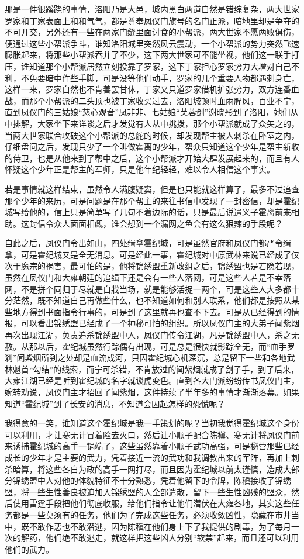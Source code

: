 那是一件很蹊跷的事情，洛阳乃是大邑，城内黑白两道自然是错综复杂，两大世家罗家和丁家表面上和和气气，都是尊奉凤仪门旗号的名门正派，暗地里却是争夺的不可开交，另外还有一些在两家门缝里面讨食的小帮派，两大世家不愿两败俱伤，便通过这些小帮派争斗，谁知洛阳城里突然风云震动，一个小帮派的势力突然飞速膨胀起来，将那些小帮派吞并了不少，这下两大世家可不能坐视，他们这一联手打压，谁知道那个小帮派居然立刻投靠了罗家，这下丁家担心罗家势力大增对自己不利，不免要暗中作些手脚，可是没等他们动手，罗家的几个重要人物都遇刺身亡，这样一来，罗家自然也不肯善罢甘休，丁家又只道罗家借机扩张势力，双方连番血战，而那个小帮派的二头顶也被丁家收买过去，洛阳城顿时血雨腥风，百业不宁，直到凤仪门的三姑娘“慈心观音”凤非非、七姑娘“芙蓉剑”谢晓彤到了洛阳，她们从中排解，大家坐下来详谈之后才发觉有人从中挑拨，那个小帮派就成了众矢之的，当两大世家联合攻破这个小帮派的总舵的时候，却发现帮主被人刺杀在卧室之内，仔细盘问之后，发现只少了一个叫做霍离的少年，帮众只知道这个少年是帮主新收的侍卫，也是从他来到了帮中之后，这个小帮派才开始大肆发展起来的，而且有人怀疑这个少年正是帮主的军师，只是他年纪轻轻，难以令人相信这个事实。

若是事情就这样结束，虽然令人满腹疑窦，但是也只能就这样算了，最多不过追查那个少年的来历，可是问题是在那个帮主的来往书信中发现了一封密信，却是霍纪城写给他的，信上只是简单写了几句不着边际的话，只是最后说遣义子霍离前来相助。这封信令众人面面相觑，谁会想到一个漏网之鱼会有这么狠辣的手段呢？

自此之后，凤仪门令出如山，四处缉拿霍纪城，可是虽然官府和凤仪门都严令缉拿，可是霍纪城又是全无消息。可是经此一事，霍纪城对中原武林来说已经成了仅次于魔宗的祸害，最可怕的是，他将锦绣盟重新改组之后，锦绣盟也是若隐若现，虽然在凤仪门和大雍朝廷的追缉下还是会有一些人落网，可是这些人若是不幸落网，不是拼个同归于尽就是自戕当场，就是能够活捉一两个，可是这些人大多都十分茫然，既不知道自己再做些什么，也不知道如何和别人联系，他们都是按照从某些地方得到书面指令行事的，可是到了这里就再也查不下去。可是从已经得到的情报，可以看出锦绣盟已经成了一个神秘可怕的组织。所以凤仪门主的大弟子闻紫烟再次出现江湖，负责追杀锦绣盟中人，凤仪门传令江湖，凡是锦绣盟中人，杀之无赦。从那以后，霍纪城虽然行踪偶有出现，可是总是很快就影踪全无，而“血手罗刹”闻紫烟所到之处却是血流成河，只因霍纪城心机深沉，总是留下一些和各地武林魁首“勾结”的线索，而宁可杀错，不肯放过的闻紫烟就成了刽子手，到了后来，大雍江湖已经是听到霍纪城的名字就谈虎变色。直到各大门派纷纷传书凤仪门主，婉转劝说，凤仪门主才招回了闻紫烟，这件持续了半年多的事情才渐渐落幕。如果知道“霍纪城”到了长安的消息，不知道会因起怎样的恐慌呢？

我得意的一笑，谁知道这个霍纪城是我一手策划的呢？当初我觉得霍纪城这个身份可以利用，才让寒无计冒着险去灭口，然后让小顺子配合陈稹、寒无计将凤仪门前来诱捕霍纪城的高手一锅端了，这些虽然靠着小顺子武功高强，可是秘营那些已经成长的少年才是主要的武力，凭着接近一流的武功和我调教出来的军阵，再加上刺杀暗算，将这些各自为政的高手一网打尽，而且因为霍纪城以前太谨慎，造成大部分锦绣盟中人对他的体貌特征不十分熟悉，凭着他留下的令牌，陈稹接收了锦绣盟，将一些生性善良被迫加入锦绣盟的人全部遣散，留下一些生性凶残的盟众，然后使用雷霆手段把他们彻底收服，给他们指令让他们潜伏在大雍各地，其实这些任务都是一些莫须有的任务，他们为了完成这些任务，必须收敛凶性，隐藏在市井当中，既不敢作恶也不敢潜逃，因为陈稹在他们身上下了我提供的剧毒，为了每月一次的解药，他们绝不敢逃走，就这样把这些凶人分别“软禁”起来，而且还可以利用他们的武力。

